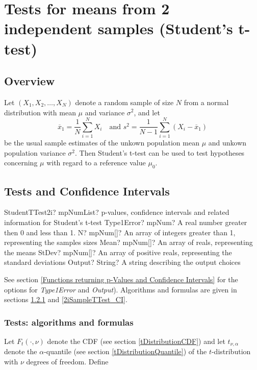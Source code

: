 \newpage
\section{Tests for means from 2 independent samples (Student's t-test)}
\label{2iSampleTTest}

\subsection{Overview}
\label{2iSampleTTestOverview}

Let $(X_1, X_2, \ldots, X_N)$ denote a random sample of size $N$ from a normal distribution with mean $\mu$ and variance $\sigma^2$, and let
\begin{equation}
	\overline{x}_1 = \frac{1}{N} \sum_{i=1}^N X_i \quad \text{and } s^2 = \frac{1}{N-1} \sum_{i=1}^N (X_i - \overline{x}_1)
\end{equation}
be the usual sample estimates of the unkown population mean $\mu$ and unkown population variance $\sigma^2$. Then Student's t-test can be used to test hypotheses concerning $\mu$ with regard to a reference value $\mu_0$.



\subsection{Tests and Confidence Intervals}

\begin{mpFunctionsExtract}
	\mpFunctionFiveNotImplemented
	{StudentTTest2i? mpNumList? p-values, confidence intervals and related information for Student's t-test}
	{Type1Error? mpNum? A real number greater then 0 and less than 1.}
	{N? mpNum[]? An array of integers greater than 1, representing the samples sizes}
	{Mean? mpNum[]? An array of reals, representing the means}
	{StDev? mpNum[]? An array of positive reals, representing the standard deviations}
	{Output? String? A string describing the output choices}
\end{mpFunctionsExtract}

\vspace{0.3cm}
See section \ref{Functions returning p-Values and Confidence Intervals} for the options for {\itshape\sffamily Type1Error} and {\itshape\sffamily Output}). Algorithms and formulas are given in sections \ref{2iSampleTTest_Test} and \ref{2iSampleTTest_CI}.



\subsubsection{Tests: algorithms and formulas}
\label{2iSampleTTest_Test}
Let $F_t\left(\cdot, \nu\right)$ denote the CDF (see section \ref{tDistributionCDF}) and let $t_{\nu,\alpha}$ denote the $\alpha$-quantile (see section \ref{tDistributionQuantile}) of the $t$-distribution with $\nu$ degrees of freedom. Define

